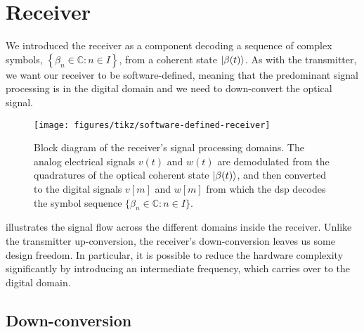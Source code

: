 \section{Receiver}
\FloatBarrier

We introduced the receiver as a component decoding a sequence of complex symbols, $\left\{\beta_n\in\mathbb{C}\colon n\in I\right\}$, from a coherent state $\lvert\beta(t)\rangle$.
As with the transmitter, we want our receiver to be software-defined, meaning that the predominant signal processing is in the digital domain and we need to down-convert the optical signal.
\begin{figure}[htb]
	\centering
	\texttt{[image: figures/tikz/software-defined-receiver]}
	\caption{Block diagram of the receiver's signal processing domains. The analog electrical signals $v(t)$ and $w(t)$ are demodulated from the quadratures of the optical coherent state $\lvert\beta(t)\rangle$, and then converted to the digital signals $v[m]$ and $w[m]$ from which the \gls{dsp} decodes the symbol sequence $\{\beta_n\in\mathbb{C}\colon n\in I\}$.}\label{fig:software_defined_receiver}
\end{figure}
 illustrates the signal flow across the different domains inside the receiver.
Unlike the transmitter up-conversion, the receiver's down-conversion leaves us some design freedom.
In particular, it is possible to reduce the hardware complexity significantly by introducing an intermediate frequency, which carries over to the digital domain.

\FloatBarrier
\subsection{Down-conversion}

